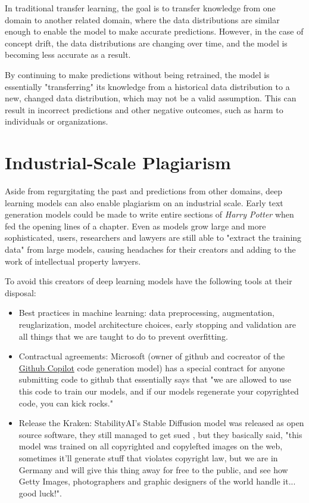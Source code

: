In traditional transfer learning, the goal is to transfer knowledge from one domain to another related domain, where the data distributions are similar enough to enable the model to make accurate predictions. However, in the case of concept drift, the data distributions are changing over time, and the model is becoming less accurate as a result. 

By continuing to make predictions without being retrained, the model is essentially "transferring" its knowledge from a historical data distribution to a new, changed data distribution, which may not be a valid assumption. This can result in incorrect predictions and other negative outcomes, such as harm to individuals or organizations.

\section{Industrial-Scale Plagiarism}

Aside from regurgitating the past and predictions from other domains, deep learning models can also enable plagiarism on an industrial scale. Early text generation models could be made to write entire sections of \textit{Harry Potter} when fed the opening lines of a chapter. Even as models grow large and more sophisticated, users, researchers and lawyers are still able to "extract the training data"  from large models, causing headaches for their creators and adding to the work of intellectual property lawyers. 

To avoid this creators of deep learning models have the following tools at their disposal:


\begin{itemize}
\item Best practices in  machine learning: data preprocessing, augmentation, reuglarization, model architecture choices, early stopping and validation are all things that we are taught to do to prevent overfitting.
\item Contractual agreements: Microsoft (owner of github and cocreator of the \href{https://github.com/features/copilot}{Github Copilot} code generation model) has a special contract for anyone submitting code to github that essentially says that "we are allowed to use this code to train our models, and if our models regenerate your copyrighted code, you can kick rocks."
\item Release the Kraken: StabilityAI's Stable Diffusion model was released as open source software, they still managed to get sued \cite{getty}, but they basically said, "this model was trained on all copyrighted and copylefted images on the web, sometimes it'll generate stuff that violates copyright law, but we are in Germany and will give this thing away for free to the public, and see how Getty Images, photographers and graphic designers of the world handle it... good luck!". 
\end{itemize}


